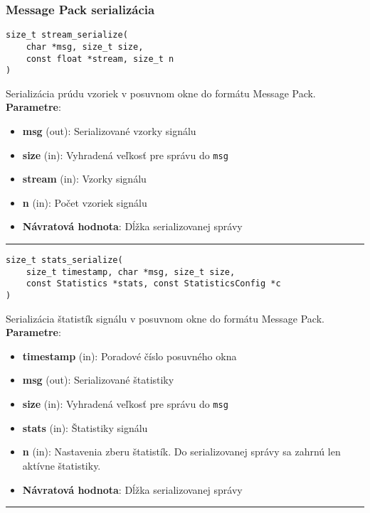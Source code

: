 \subsubsection*{Message Pack serializácia}
\begin{lstlisting}[style=docs]
size_t stream_serialize(
	char *msg, size_t size, 
	const float *stream, size_t n
)
\end{lstlisting}
Serializácia prúdu vzoriek v posuvnom okne do formátu Message Pack. \\ 
\textbf{Parametre}:
\begin{itemize}[noitemsep, topsep=0pt]
	\item \textbf{msg} (out): Serializované vzorky signálu
	\item \textbf{size} (in): Vyhradená veľkosť pre správu do \verb|msg|
	\item \textbf{stream} (in): Vzorky signálu
	\item \textbf{n} (in): Počet vzoriek signálu
 	\item \textbf{Návratová hodnota}: Dĺžka serializovanej správy
\end{itemize}
\bigbreak
\hrule

\begin{lstlisting}[style=docs]
size_t stats_serialize(
	size_t timestamp, char *msg, size_t size, 
	const Statistics *stats, const StatisticsConfig *c
)
\end{lstlisting}
Serializácia štatistík signálu v posuvnom okne do formátu Message Pack. \\ 
\textbf{Parametre}:
\begin{itemize}[noitemsep, topsep=0pt]
	\item \textbf{timestamp} (in): Poradové číslo posuvného okna
 	\item \textbf{msg} (out): Serializované štatistiky
 	\item \textbf{size} (in): Vyhradená veľkosť pre správu do \verb|msg|
 	\item \textbf{stats} (in): Štatistiky signálu
 	\item \textbf{n} (in): Nastavenia zberu štatistík. Do serializovanej správy sa zahrnú len aktívne štatistiky.
 	\item \textbf{Návratová hodnota}: Dĺžka serializovanej správy
\end{itemize}
\bigbreak
\hrule


